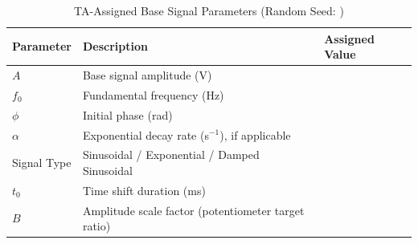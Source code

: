\documentclass[11pt,letterpaper]{article}
\begin{document}
\begin{table}[H]
    \centering
    \caption{TA-Assigned Base Signal Parameters \quad (Random Seed: \underline{\hspace{2cm}})}
    \label{tab:assigned_params}
    \begin{tabularx}{\linewidth}{l X l}
    \toprule
    \textbf{Parameter} & \textbf{Description} & \textbf{Assigned Value}\\
    \midrule
    $A$           & Base signal amplitude (V)                              & \underline{\hspace{2.5cm}}\\
    $f_0$         & Fundamental frequency (Hz)                             & \underline{\hspace{2.5cm}}\\
    $\phi$        & Initial phase (rad)                                    & \underline{\hspace{2.5cm}}\\
    $\alpha$      & Exponential decay rate (s$^{-1}$), if applicable       & \underline{\hspace{2.5cm}}\\
    Signal Type   & Sinusoidal / Exponential / Damped Sinusoidal           & \underline{\hspace{2.5cm}}\\
    $t_0$         & Time shift duration (ms)                               & \underline{\hspace{2.5cm}}\\
    $B$           & Amplitude scale factor (potentiometer target ratio)    & \underline{\hspace{2.5cm}}\\
    \bottomrule
    \end{tabularx}
\end{table}
\end{document}
